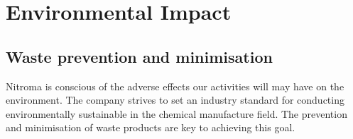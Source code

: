 \section{Environmental Impact}

\subsection{Waste prevention and minimisation }

Nitroma is conscious of the adverse effects our activities will may have on the environment. The company strives to set an industry standard for conducting environmentally sustainable in the chemical manufacture field. The prevention and minimisation of waste products are key to achieving this goal. 